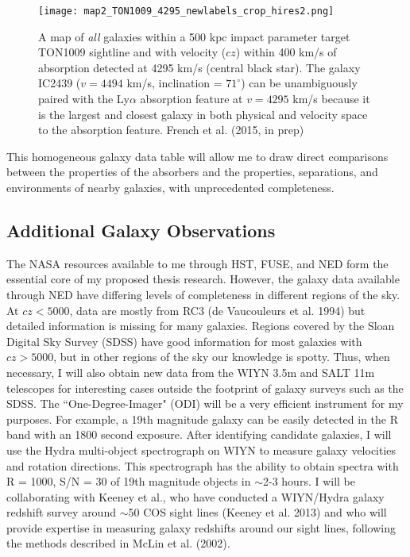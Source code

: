 \documentclass[iop]{emulateapj-rtx4}
\begin{document}
\begin{figure}[h!]
  \centering
  \texttt{[image: map2\_TON1009\_4295\_newlabels\_crop\_hires2.png]}
  \caption{A map of \textit{all} galaxies within a 500 kpc impact parameter target TON1009 sightline and with velocity ($cz$) within 400 km/s of absorption detected at 4295 km/s (central black star). The galaxy IC2439 ($v=4494$ km/s, inclination = $71^{\circ}$) can be unambiguously paired with the Ly$\alpha$ absorption feature at $v=4295$ km/s because it is the largest and closest galaxy in both physical and velocity space to the absorption feature. French et al. (2015, in prep)}
  \label{impactmap}
\label{TON1009}
\vspace{5pt}
\end{figure} This homogeneous galaxy data table will allow me to draw direct comparisons between the properties of the absorbers and the properties, separations, and environments of nearby galaxies, with unprecedented completeness.


\subsection{Additional Galaxy Observations}

\indent The NASA resources available to me through HST, FUSE, and NED form the essential core of my proposed thesis research. However, the galaxy data available through NED have differing levels of completeness in different regions of the sky. At $cz<5000$, data are mostly from RC3 (de Vaucouleurs et al. 1994) but detailed information is missing for many galaxies. Regions covered by the Sloan Digital Sky Survey (SDSS) have good information for most galaxies with $cz>5000$, but in other regions of the sky our knowledge is spotty. Thus, when necessary, I will also obtain new data from the WIYN 3.5m and SALT 11m telescopes for interesting cases outside the footprint of galaxy surveys such as the SDSS. The ``One-Degree-Imager" (ODI) will be a very efficient instrument for my purposes. For example, a 19th magnitude galaxy can be easily detected in the R band with an 1800 second exposure. After identifying candidate galaxies, I will use the Hydra multi-object spectrograph on WIYN to measure galaxy velocities and rotation directions. This spectrograph has the ability to obtain spectra with R = 1000, S/N = 30 of 19th magnitude objects in $\sim$2-3 hours. I will be collaborating with Keeney et al., who have conducted a WIYN/Hydra galaxy redshift survey around $\sim$50 COS sight lines (Keeney et al. 2013) and who will provide expertise in measuring galaxy redshifts around our sight lines, following the methods described in McLin et al. (2002). 
\end{document}
